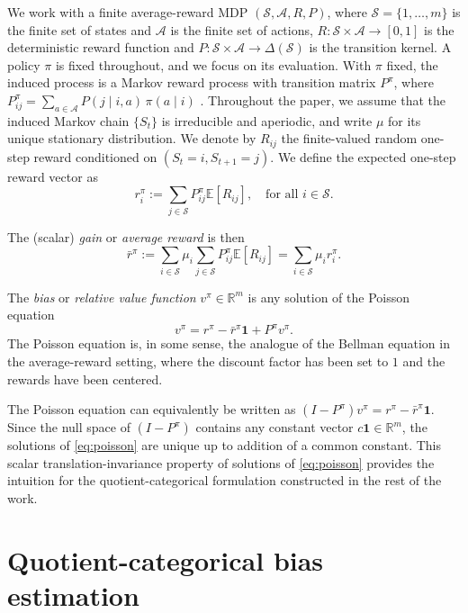 \documentclass{article}
\newcommand{\X}{\mathcal{S}}
\newcommand{\A}{\mathcal{A}}
\newcommand{\R}{\mathbb{R}}
\newcommand{\E}{\mathbb{E}}
\begin{document}
We work with a finite average-reward MDP \citep{puterman} $(\X, \A, R, P)$, where $\X = \{1,\dots,m\}$ is the finite set of states and $\A$ is the finite set of actions, $R: \X \times \A \to [0, 1]$ is the deterministic reward function and $P:\X \times \A \to \Delta(\X)$ is the transition kernel. A policy $\pi$ is fixed throughout, and we focus on its evaluation. With $\pi$ fixed, the induced process is a Markov reward process with transition matrix $P^\pi$, where $P^\pi_{ij} = \sum_{a\in\A}P(j \mid i, a) \,\pi(a \mid i)$ \citep{sutton1998reinforcement}. Throughout the paper, we assume that the induced Markov chain $\{S_t\}$ is irreducible and aperiodic, and write $\mu$ for its unique stationary distribution. We denote by $R_{ij}$ the finite-valued random one-step reward conditioned on $(S_t = i, S_{t+1} = j)$. We define the expected one-step reward vector as
\begin{equation}\label{eq:average-reward}
r^\pi_i := \sum_{j\in \X} P^\pi_{ij} \E[R_{ij}],\quad \text{for all } i \in \X.
\end{equation}

The (scalar) \emph{gain} or \emph{average reward} is then
\begin{equation}
\bar r^\pi := \sum_{i\in \X} \mu_i \sum_{j\in\X}P^\pi_{ij} \E[R_{ij}] = \sum_{i \in \X} \mu_i r^\pi_i.
\end{equation}

The \emph{bias} or \emph{relative value function} \citep{puterman} $v^\pi \in \R^m$ is any solution of the Poisson equation \citep{Meyn_Tweedie_Glynn_2009}
\begin{equation}\label{eq:poisson}
v^\pi = r^\pi - \bar r^\pi \mathbf 1 + P^\pi v^\pi.
\end{equation}
The Poisson equation is, in some sense, the analogue of the Bellman equation \citep{bellman1966dynamic} in the average-reward setting, where the discount factor has been set to $1$ and the rewards have been centered. 

The Poisson equation can equivalently be written as $(I- P^\pi) v^\pi = r^\pi - \bar r^\pi \mathbf 1$. Since the null space of $(I-P^\pi)$ contains any constant vector $c\mathbf 1 \in \R^m$, the solutions of \eqref{eq:poisson} are unique up to addition of a common constant. This scalar translation-invariance property of solutions of \eqref{eq:poisson} provides the intuition for the quotient-categorical formulation constructed in the rest of the work.

\section{Quotient-categorical bias estimation}\label{sec:quotient}
\end{document}
